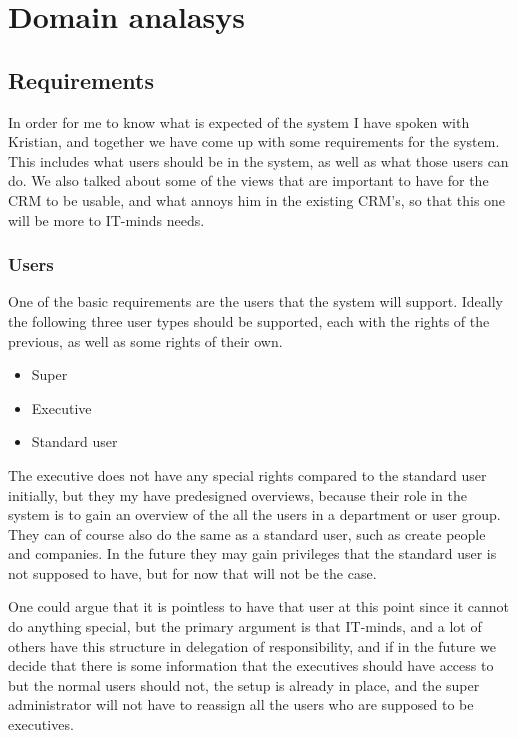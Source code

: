 \chapter{Domain analasys}
\label{chap:Domain analasys}

\section{Requirements}
\label{sec:Requirements}
In order for me to know what is expected of the system I have spoken with Kristian, and together we have come up with some requirements for the system. This includes what users should be in the system, as well as what those users can do. We also talked about some of the views that are important to have for the CRM to be usable, and what annoys him in the existing CRM's, so that this one will be more to IT-minds needs.

\subsection{Users}
\label{sub:Users}

One of the basic requirements are the users that the system will support. Ideally the following three user types should be supported, each with the rights of the previous, as well as some rights of their own.

\begin{itemize}
  \item Super
  \item Executive
  \item Standard user
\end{itemize}

The executive does not have any special rights compared to the standard user initially, but they my have predesigned overviews, because their role in the system is to gain an overview of the all the users in a department or user group. They can of course also do the same as a standard user, such as create people and companies. In the future they may gain privileges that the standard user is not supposed to have, but for now that will not be the case.

One could argue that it is pointless to have that user at this point since it cannot do anything special, but the primary argument is that IT-minds, and a lot of others have this structure in delegation of responsibility, and if in the future we decide that there is some information that the executives should have access to but the normal users should not, the setup is already in place, and the super administrator will not have to reassign all the users who are supposed to be executives.

